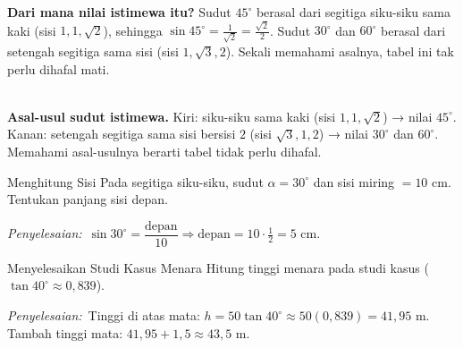 \documentclass[11pt,a4paper]{report}
\theoremstyle{gaya}
\newcommand{\jawab}{\par\smallskip\noindent\textit{\textcolor{oranye}{Penyelesaian:}}\ }
\begin{document}
\textbf{Dari mana nilai istimewa itu?} Sudut $45^\circ$ berasal dari segitiga siku-siku sama kaki (sisi $1,1,\sqrt2$), sehingga $\sin45^\circ=\tfrac{1}{\sqrt2}=\tfrac{\sqrt2}{2}$. Sudut $30^\circ$ dan $60^\circ$ berasal dari setengah segitiga sama sisi (sisi $1,\sqrt3,2$). Sekali memahami asalnya, tabel ini tak perlu dihafal mati.

\begin{center}
\\[6pt]
\small\textbf{Asal-usul sudut istimewa.} Kiri: siku-siku sama kaki (sisi $1,1,\sqrt{2}$) → nilai $45^\circ$. Kanan: setengah segitiga sama sisi bersisi $2$ (sisi $\sqrt{3},1,2$) → nilai $30^\circ$ dan $60^\circ$. Memahami asal-usulnya berarti tabel tidak perlu dihafal.
\end{center}

\begin{contoh}{Menghitung Sisi}
Pada segitiga siku-siku, sudut $\alpha = 30^\circ$ dan sisi miring $= 10$ cm. Tentukan panjang sisi depan.

\jawab $\sin 30^\circ = \dfrac{\text{depan}}{10} \Rightarrow \text{depan} = 10 \cdot \tfrac12 = 5$ cm.
\end{contoh}

\begin{contoh}{Menyelesaikan Studi Kasus Menara}
Hitung tinggi menara pada studi kasus ($\tan 40^\circ\approx 0{,}839$).

\jawab Tinggi di atas mata: $h=50\tan40^\circ\approx 50(0{,}839)=41{,}95$ m. Tambah tinggi mata: $41{,}95+1{,}5\approx 43{,}5$ m.
\end{contoh}
\end{document}
